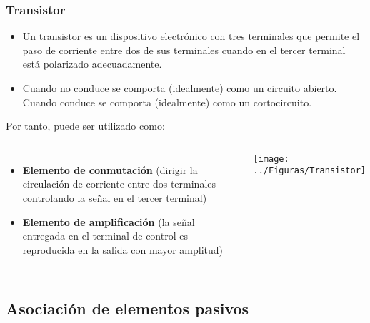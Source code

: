\documentclass[serif, xcolor=dvipsnames]{beamer}
\begin{document}
\begin{frame}[plain]
  \frametitle{Transistor}
  \begin{itemize}
  \item Un transistor es un dispositivo electrónico con tres
    terminales que permite el paso de corriente entre dos de sus
    terminales cuando en el tercer terminal está polarizado
    adecuadamente.
  \item Cuando no conduce se comporta (idealmente) como un circuito
    abierto.  Cuando conduce se comporta (idealmente) como un
    cortocircuito.
  \end{itemize}
  Por tanto, puede ser utilizado como:
  \begin{columns}%


    \column{8cm}
    \begin{itemize}
    \item \textbf{Elemento de conmutación} (dirigir la circulación de
      corriente entre dos terminales controlando la señal en el tercer
      terminal)
    \item \textbf{Elemento de amplificación} (la señal entregada en el
      terminal de control es reproducida en la salida con mayor
      amplitud)
    \end{itemize}

    \column{3cm}


    \begin{center}
      \texttt{[image: ../Figuras/Transistor]}
      \par\end{center}

  \end{columns}%

\end{frame}

\subsection{Asociación de elementos pasivos}
\end{document}
